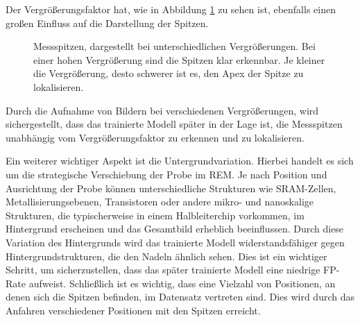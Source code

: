 Der Vergrößerungsfaktor hat, wie in Abbildung \ref{fig:mags} zu sehen ist, ebenfalls einen großen Einfluss auf die Darstellung der Spitzen.
\begin{figure}[htbp]
    \centering
    \caption{Messspitzen, dargestellt bei unterschiedlichen Vergrößerungen. Bei einer hohen Vergrößerung sind die Spitzen klar erkennbar. Je kleiner die Vergrößerung, desto schwerer ist es, den Apex der Spitze zu lokalisieren.}
    \label{fig:mags}
\end{figure}
Durch die Aufnahme von Bildern bei verschiedenen Vergrößerungen, wird sichergestellt, dass das trainierte Modell später in der Lage ist, die Messspitzen unabhängig vom Vergrößerungsfaktor zu erkennen und zu lokalisieren.

Ein weiterer wichtiger Aspekt ist die Untergrundvariation. Hierbei handelt es sich um die strategische Verschiebung der Probe im REM. Je nach Position und Ausrichtung der Probe können unterschiedliche Strukturen wie SRAM-Zellen, Metallisierungsebenen, Transistoren oder andere mikro- und nanoskalige Strukturen, die typischerweise in einem Halbleiterchip vorkommen, im Hintergrund erscheinen und das Gesamtbild erheblich beeinflussen. Durch diese Variation des Hintergrunds wird das trainierte Modell widerstandsfähiger gegen Hintergrundstrukturen, die den Nadeln ähnlich sehen. Dies ist ein wichtiger Schritt, um sicherzustellen, dass das später trainierte Modell eine niedrige FP-Rate aufweist.
Schließlich ist es wichtig, dass eine Vielzahl von Positionen, an denen sich die Spitzen befinden, im Datensatz vertreten sind. Dies wird durch das Anfahren verschiedener Positionen mit den Spitzen erreicht. 

